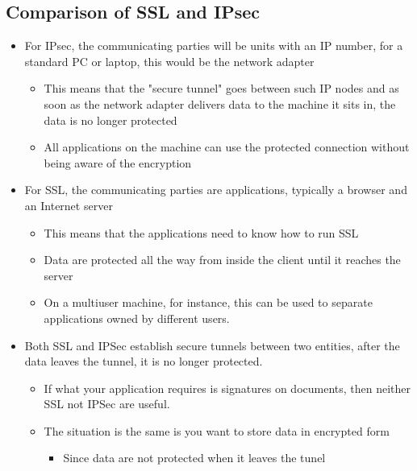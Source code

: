 \documentclass[11pt]{article}
\begin{document}
\subsection{Comparison of SSL and IPsec}
\label{sec:orge6dcbaf}
\begin{itemize}
\item For IPsec, the communicating parties will be units with an IP number, for a standard PC or laptop, this would be the network adapter
\begin{itemize}
\item This means that the "secure tunnel" goes between such IP nodes and as soon as the network adapter delivers data to the machine it sits in, the data is no longer protected
\item All applications on the machine can use the protected connection without being aware of the encryption
\end{itemize}

\item For SSL, the communicating parties are applications, typically a browser and an Internet server
\begin{itemize}
\item This means that the applications need to know how to run SSL
\item Data are protected all the way from inside the client until it reaches the server
\item On a multiuser machine, for instance, this can be used to separate applications owned by different users.
\end{itemize}

\item Both SSL and IPSec establish secure tunnels between two entities, after the data leaves the tunnel, it is no longer protected.
\begin{itemize}
\item If what your application requires is signatures on documents, then neither SSL not IPSec are useful.
\item The situation is the same is you want to store data in encrypted form
\begin{itemize}
\item Since data are not protected when it leaves the tunel
\end{itemize}
\end{itemize}
\end{itemize}
\end{document}
